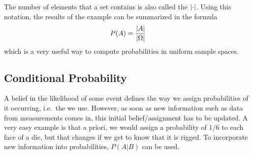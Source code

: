The number of elements that a set contains is also called the  $\abs{\cdot}$. Using this notation, the results of the example can be summarized in the formula
\begin{equation}
P(A) = \frac{\abs{A}}{\abs{\Omega}}
\end{equation}
which is a very useful way to compute probabilities in uniform sample spaces.



	\subsection{Conditional Probability}
A belief in the likelihood of some event defines the way we assign probabilities of it occurring, i.e.~the  we use. However, as soon as new information such as data from measurements comes in, this initial belief/assignment has to be updated. A very easy example is that a priori, we would assign a probability of $1 / 6$ to each face of a die, but that changes if we get to know that it is rigged. To incorporate new information into probabilities,  $P(A | B)$ can be used.



